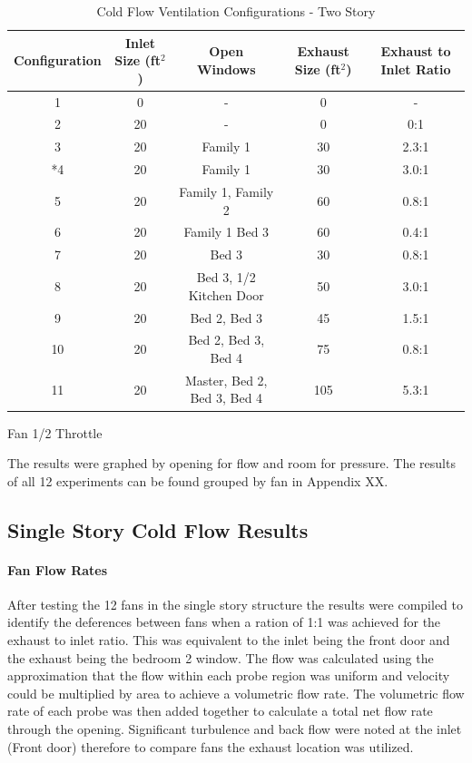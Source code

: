 \documentclass{article}
\begin{document}
\begin{table} [H]
	\caption{Cold Flow Ventilation Configurations - Two Story}
	\begin{tabular}{|c|c|c|c|c|}
		\hline
		Configuration & Inlet Size (ft$^2$) & Open Windows & Exhaust Size (ft$^2$) & Exhaust to Inlet Ratio \\ \hline \hline
		1 & 0 & - & 0 & - \\ \hline
		2 & 20 & - & 0 & 0:1 \\ \hline
		3 & 20 & Family 1 & 30 & 2.3:1 \\ \hline
		*4 & 20 & Family 1 & 30 & 3.0:1 \\ \hline
		5 & 20 & Family 1, Family 2 & 60 & 0.8:1 \\ \hline
		6 & 20 & Family 1 Bed 3 & 60 & 0.4:1 \\ \hline
		7 & 20 & Bed 3 & 30 & 0.8:1 \\ \hline
		8 & 20 & Bed 3, 1/2 Kitchen Door & 50 & 3.0:1 \\ \hline
		9 & 20 & Bed 2, Bed 3 & 45 & 1.5:1 \\ \hline
		10 & 20 & Bed 2, Bed 3, Bed 4 & 75 & 0.8:1 \\ \hline
		11 & 20 & Master, Bed 2, Bed 3, Bed 4 & 105 & 5.3:1 \\ \hline
	\end{tabular}
	\begin{tablenotes}
	\item *Fan 1/2 Throttle
	\end{tablenotes}
	\label{tab:ColdFlowConfig_TwoStory}
\end{table}

The results were graphed by opening for flow and room for pressure. The results of all 12 experiments can be found grouped by fan in Appendix XX. 

\subsection{Single Story Cold Flow Results}

\paragraph{Fan Flow Rates} \mbox{}

After testing the 12 fans in the single story structure the results were compiled to identify the deferences between fans when a ration of 1:1 was achieved for the exhaust to inlet ratio. This was equivalent to the inlet being the front door and the exhaust being the bedroom 2 window.  The flow was calculated using the approximation that the flow within each probe region was uniform and velocity could be multiplied by area to achieve a volumetric flow rate. The volumetric flow rate of each probe was then added together to calculate a total net flow rate through the opening. Significant turbulence and back flow were noted at the inlet (Front door) therefore to compare fans the exhaust location was utilized. 
\end{document}
